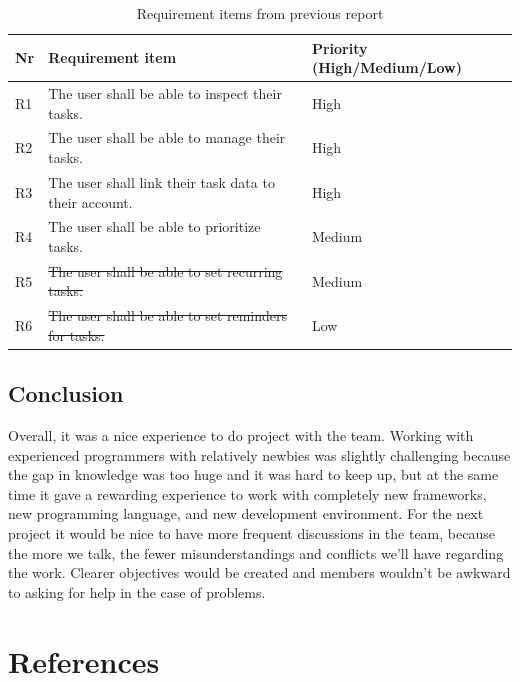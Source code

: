 \documentclass{article}
\begin{document}
\begin{table}[H]
  \centering
  \begin{tabularx}{\textwidth}{|l|X|l|}
    \toprule
    \textbf{Nr} & \textbf{Requirement item}                                 & \textbf{Priority (High/Medium/Low)} \\
    \hline
    R1          & The user shall be able to inspect their tasks.            & High                                \\
    \hline
    R2          & The user shall be able to manage their tasks.             & High                                \\
    \hline
    R3          & The user shall link their task data to their account.     & High                                \\
    \hline
    R4          & The user shall be able to prioritize tasks.               & Medium                              \\
    \hline
    R5          & \sout{The user shall be able to set recurring tasks.}     & Medium                              \\
    \hline
    R6          & \sout{The user shall be able to set reminders for tasks.} & Low                                 \\
    \bottomrule
  \end{tabularx}
  \caption{Requirement items from previous report}
  \label{Requirement items from previous report}
\end{table}

\subsection{Conclusion}
Overall, it was a nice experience to do project with the team. Working with experienced programmers with relatively newbies was slightly challenging because the gap in knowledge was too huge and it was hard to keep up, but at the same time it gave a rewarding experience to work with completely new frameworks, new programming language, and new development environment.
For the next project it would be nice to have more frequent discussions in the team, because the more we talk, the fewer misunderstandings and conflicts we’ll have regarding the work. Clearer objectives would be created and members wouldn't be awkward to asking for help in the case of problems.

\clearpage

\section{References}
\nocite{*}
\printbibliography[heading=none]
\end{document}
